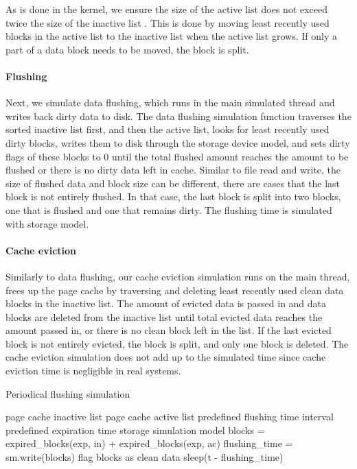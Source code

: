 \documentclass[conference]{IEEEtran}
\newcommand{\Desc}[2]{\State \makebox[2em][l]{#1}#2}
\begin{document}
            As is done in the kernel, we ensure the size of the active list does not 
            exceed twice the size of the inactive list 
			\cite{gorman2004understanding, linuxdev3rd2010}. 
			This is done by moving least recently used blocks in the active list 
			to the inactive list when the active list grows. If only a part of a data 
			block needs to be moved, the block is split.

			\paragraph*{Flushing}
			Next, we simulate data flushing, which runs in the main simulated 
			thread and writes back dirty data to disk. 
			The data flushing simulation function traverses the sorted 
			inactive list first, and then the active list, looks for least recently used 
			dirty blocks, writes them to disk through the storage device model, 
			and sets dirty flags of these blocks to 0 until the total flushed amount 
			reaches the amount to be flushed or there is no dirty data left in cache. 
			Similar to file read and write, the size of flushed data and block size 
			can be different, there are cases that the last block is not entirely flushed.  
			In that case, the last block is split into two blocks, one that is flushed 
			and one that remains dirty.
			The flushing time is simulated with storage model.
			
			\paragraph*{Cache eviction}	
			Similarly to data flushing, our cache eviction simulation runs on 
			the main thread, frees up the page cache by traversing and deleting 
			least recently used clean data blocks in the inactive list.
			The amount of evicted data is passed in and data blocks are deleted 
			from the inactive list until total evicted data reaches the amount 
			passed in, or there is no clean block left in the list.
			If the last evicted block is not entirely evicted, the block is split, 
			and only one block is deleted.
			The cache eviction simulation does not add up to the simulated time 
			since cache eviction time is negligible in real systems.		
			
			\begin{algorithm}\caption{Periodical flushing simulation}\label{alg:pdflush}
				\small
				\begin{algorithmic}[1]
					\Input
        				\Desc{in}{page cache inactive list}
        				\Desc{ac}{page cache active list}
						\Desc{t}{predefined flushing time interval}
						\Desc{exp}{predefined expiration time}						
						\Desc{sm}{storage simulation model}
   					\EndInput
						\State blocks = expired\_blocks(exp, in) + expired\_blocks(exp, ac) 
						\State flushing\_time = sm.write(blocks)
						\State flag blocks as clean data
							\State sleep(t - flushing\_time)
						\EndIf
					\EndWhile
				\end{algorithmic}
			\end{algorithm}				
\end{document}
